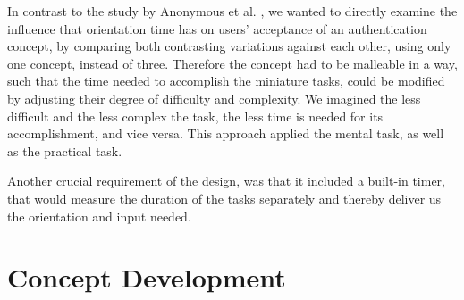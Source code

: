 In contrast to the study by Anonymous et al. \cite{anonymous}, we wanted to directly examine the influence that orientation time has on users' acceptance of an authentication concept, by comparing both contrasting variations against each other, using only one concept, instead of three. Therefore the concept had to be malleable in a way, such that the time needed to accomplish the miniature tasks, could be modified by adjusting their degree of difficulty and complexity. We imagined the less difficult and the less complex the task, the less time is needed for its accomplishment, and vice versa. This approach applied the mental task, as well as the practical task. 

Another crucial requirement of the design, was that it included a built-in timer, that would measure the duration of the tasks separately and thereby deliver us the orientation and input needed.  

\section{Concept Development}






